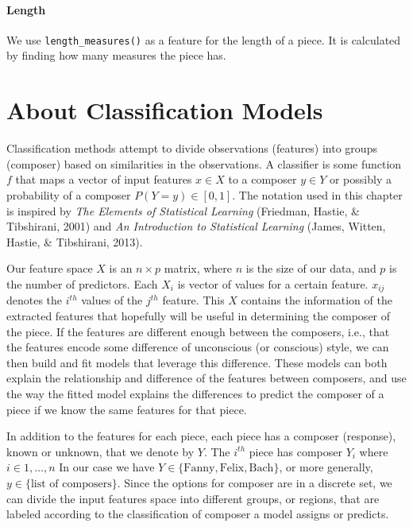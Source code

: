 \documentclass[12pt,twoside]{reedthesis}
\theoremstyle{definition}
\theoremstyle{definition}
\theoremstyle{definition}
\theoremstyle{remark}
\begin{document}
\subsubsection{Length}\label{length}

We use \texttt{length\_measures()} as a feature for the length of a
piece. It is calculated by finding how many measures the piece has.

\chapter{About Classification Models}\label{about-classification-models}

Classification methods attempt to divide observations (features) into
groups (composer) based on similarities in the observations. A
classifier is some function \(f\) that maps a vector of input features
\(x \in X\) to a composer \(y \in Y\) or possibly a probability of a
composer \(P(Y = y) \in [0,1]\). The notation used in this chapter is
inspired by \emph{The Elements of Statistical Learning} (Friedman,
Hastie, \& Tibshirani, 2001) and \emph{An Introduction to Statistical
Learning} (James, Witten, Hastie, \& Tibshirani, 2013).

Our feature space \(X\) is an \(n \times p\) matrix, where \(n\) is the
size of our data, and \(p\) is the number of predictors. Each \(X_i\) is
vector of values for a certain feature. \(x_{ij}\) denotes the
\(i^{th}\) values of the \(j^{th}\) feature. This \(X\) contains the
information of the extracted features that hopefully will be useful in
determining the composer of the piece. If the features are different
enough between the composers, i.e., that the features encode some
difference of unconscious (or conscious) style, we can then build and
fit models that leverage this difference. These models can both explain
the relationship and difference of the features between composers, and
use the way the fitted model explains the differences to predict the
composer of a piece if we know the same features for that piece.

In addition to the features for each piece, each piece has a composer
(response), known or unknown, that we denote by \(Y\). The \(i^{th}\)
piece has composer \(Y_i\) where \(i \in 1, \ldots, n\) In our case we
have \(Y \in \{\text{Fanny},\text{Felix}, \text{Bach}\}\), or more
generally, \(y \in \{\text{list of composers}\}\). Since the options for
composer are in a discrete set, we can divide the input features space
into different groups, or regions, that are labeled according to the
classification of composer a model assigns or predicts.
\end{document}
